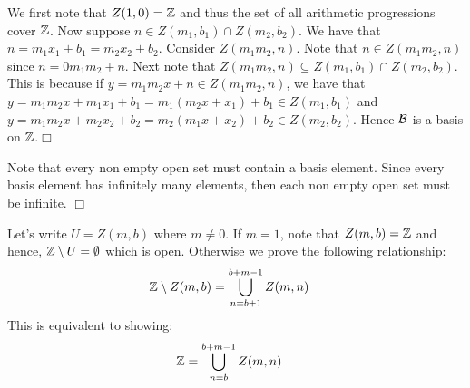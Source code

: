\documentclass{article}
\begin{document}
 {
\begin{spacedenumerate}
    \item We first note that $Z(1, 0) = \mathbb{Z}$ and thus the set of all arithmetic progressions cover $\mathbb{Z}$. Now suppose $n \in Z(m_{1}, b_{1})\cap Z(m_{2}, b_{2})$. We have that $n = m_{1}x_{1} + b_{1} = m_{2}x_{2} + b_{2}$. Consider $Z(m_{1}m_{2}, n)$. Note that $n\in Z(m_{1}m_{2}, n)$ since $n = 0m_{1}m_{2} + n$. Next note that $Z(m_{1}m_{2}, n)\subseteq Z(m_{1}, b_{1})\cap Z(m_{2}, b_{2})$. This is because if $y = m_{1}m_{2}x + n \in Z(m_{1}m_{2}, n)$, we have that $y = m_{1}m_{2}x + m_{1}x_{1} + b_{1} = m_{1}(m_{2}x + x_{1}) + b_{1}\in Z(m_{1}, b_{1})$ and $y = m_{1}m_{2}x + m_{2}x_{2} + b_{2} = m_{2}(m_{1}x + x_{2}) + b_{2}\in Z(m_{2}, b_{2})$. Hence $\mathcal{B}$ is a basis on $\mathbb{Z}$.$\Box$
    \item Note that every non empty open set must contain a basis element. Since every basis element has infinitely many elements, then each non empty open set must be infinite. $\Box$
    \item Let's write $U = Z(m,b)$ where $m \neq 0$. If $m = 1$, note that $Z(m,b) = \mathbb{Z}$ and hence, $\mathbb{Z}\setminus U  =\emptyset$ which is open. Otherwise we prove the following relationship:
    \begin{align*}
        \mathbb{Z}\setminus Z(m,b) &= \bigcup_{n = b+1}^{b+m-1}Z(m,n)
    \end{align*}
    This is equivalent to showing:
    \begin{align*}
        \mathbb{Z} &=\bigcup_{n = b}^{b+m-1}Z(m,n)
    \end{align*}

\end{spacedenumerate}}
\end{document}
